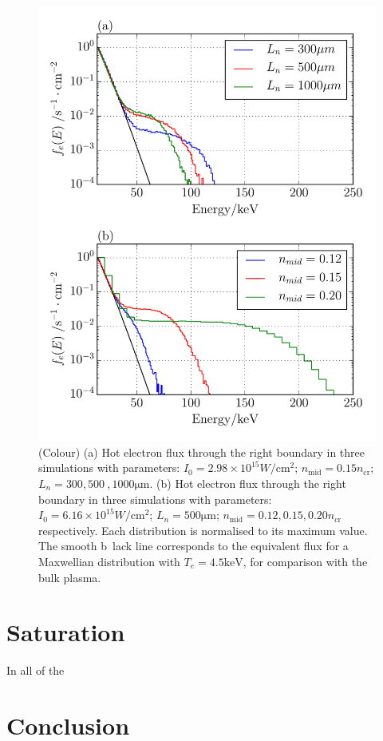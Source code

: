 \begin{figure}[ht]
   \centering
    \includegraphics[width=0.75\columnwidth]{Chapters/C4_iSRS/fig7_7a_7b.pdf}
    \caption{(Colour) (a) Hot electron flux through the right boundary in three simulations with parameters: $I_0 = 2.98\times 10^{15} \si{W / \centi \metre^2}$; $n_\mathrm{mid}=0.15 n_\mathrm{cr}$; $L_n=300,500\
,1000\si{\micro\metre}$.   (b) Hot electron flux through the right boundary in three simulations with parameters:
   $I_0 = 6.16\times 10^{15} \si{W / \centi \metre^2}$;  $L_n=500\si{\micro\metre}$; $n_\mathrm{mid}=0.12,0.15,0.20 n_\mathrm{cr}$ respectively. Each distribution is normalised to its maximum value. The smooth b\
lack line corresponds to the equivalent flux for a Maxwellian
   distribution with $T_e=4.5\si{\kilo \electronvolt}$, for comparison with the
   bulk plasma.}
    \label{fig:hotelectrons}
\end{figure}{}



\section{Saturation}
In all of the 

\section{Conclusion}\label{sec:conclusion}


